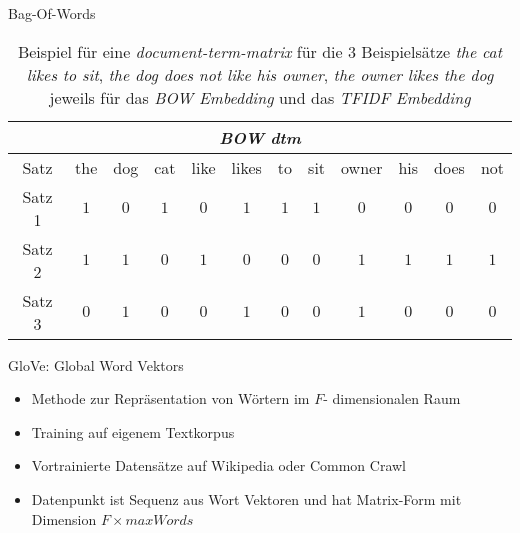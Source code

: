 \documentclass[8pt, xcolor = dvipsnames]{beamer}
\begin{document}
\begin{frame}{Bag-Of-Words}

\begin{table}[ht]
\begin{center}

\begin{tabular}{|c||ccccccccccc|}
\hline
\multicolumn{12}{|c|}{\textit{BOW} \textit{dtm}} \\
\hline 
   Satz   & the & dog & cat & like & likes &  to & sit  & owner & his &  does & not \\
      \hline
Satz 1 & $1$ & $0$ & $1$ & $0$ & $1$ & $1$ & $1$ & $0$ & $0$ &  $0$ & $0$ \\
Satz 2 & $1$ & $1$ & $0$ & $1$ & $0$ & $0$ & $0$ & $1$ & $1$ &  $1$ & $1$ \\
Satz 3 & $0$ & $1$ & $0$ & $0$ & $1$ & $0$ & $0$ & $1$ & $0$ &  $0$ & $0$ \\

\hline

\end{tabular}
\end{center}{}
\caption{Beispiel für eine \textit{document-term-matrix} für die $3$ Beispielsätze \textit{the cat likes to sit}, \textit{the dog does not like his owner}, \textit{the owner likes the dog} jeweils für das \textit{BOW Embedding} und das \textit{TFIDF Embedding} }  
\label{tab:BOWExample}

\end{table}
\end{frame}{}

\begin{frame}{GloVe: Global Word Vektors}


\begin{itemize}
    \item Methode zur Repräsentation von Wörtern im $F$- dimensionalen Raum
    \item Training auf eigenem Textkorpus
    \item Vortrainierte Datensätze auf Wikipedia oder Common Crawl
    \item Datenpunkt ist Sequenz aus Wort Vektoren und hat Matrix-Form mit Dimension $F \times maxWords$
\end{itemize}{}
    
\end{frame}{}
\end{document}

